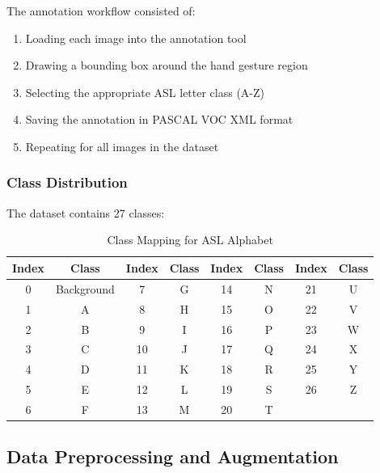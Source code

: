 \documentclass[12pt,a4paper]{article}
\begin{document}

The annotation workflow consisted of:
\begin{enumerate}
    \item Loading each image into the annotation tool
    \item Drawing a bounding box around the hand gesture region
    \item Selecting the appropriate ASL letter class (A-Z)
    \item Saving the annotation in PASCAL VOC XML format
    \item Repeating for all images in the dataset
\end{enumerate}

\subsubsection{Class Distribution}

The dataset contains 27 classes:

\begin{table}[H]
    \centering
    \caption{Class Mapping for ASL Alphabet}
    \label{tab:class_mapping}
    \begin{tabular}{|c|c|c|c|c|c|c|c|}
        \hline
        \textbf{Index} & \textbf{Class} & \textbf{Index} & \textbf{Class} & \textbf{Index} & \textbf{Class} & \textbf{Index} & \textbf{Class} \\
        \hline
        0 & Background & 7 & G & 14 & N & 21 & U \\
        1 & A & 8 & H & 15 & O & 22 & V \\
        2 & B & 9 & I & 16 & P & 23 & W \\
        3 & C & 10 & J & 17 & Q & 24 & X \\
        4 & D & 11 & K & 18 & R & 25 & Y \\
        5 & E & 12 & L & 19 & S & 26 & Z \\
        6 & F & 13 & M & 20 & T & & \\
        \hline
    \end{tabular}
\end{table}

\subsection{Data Preprocessing and Augmentation}
\end{document}
